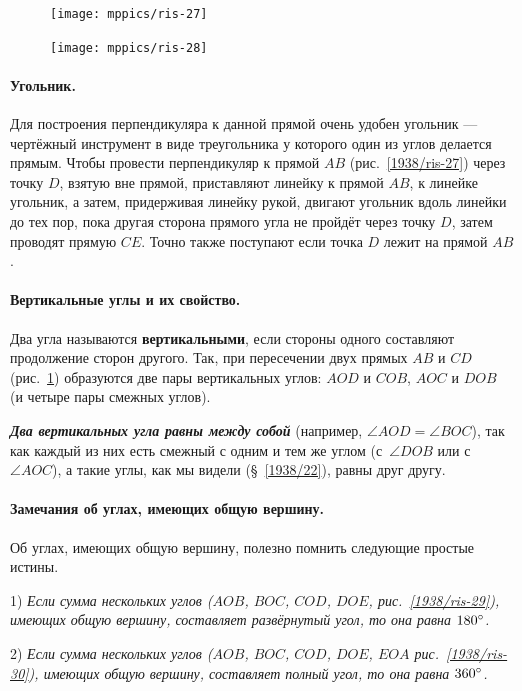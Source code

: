 \documentclass[oneside]{book}
\makeatletter
\newcommand{\rindex}[2][\imki@jobname]{%
  \index[#1]{\detokenize{#2}}%
}
\makeatother
\begin{document}
\begin{figure}
\centering
\texttt{[image: mppics/ris-27]}
\caption{}\label{1938/ris-27}
\bigskip
\texttt{[image: mppics/ris-28]}
\caption{}\label{1938/ris-28}
\end{figure}

\paragraph{Угольник.}\label{1938/25} 
Для построения перпендикуляра к данной прямой очень удобен угольник — чертёжный инструмент в виде треугольника у которого один из углов делается прямым.
Чтобы провести перпендикуляр к прямой $AB$ (рис.~\ref{1938/ris-27}) через точку $D$, взятую вне прямой, приставляют линейку к прямой $AB$, к линейке угольник, а затем, придерживая линейку рукой, двигают угольник вдоль линейки до тех пор, пока другая сторона прямого угла не пройдёт через точку $D$, затем проводят прямую $CE$.
Точно также поступают если точка $D$ лежит на прямой $AB$.

\paragraph{Вертикальные углы и их свойство.}\label{1938/26}
Два угла называются \rindex{вертикальные углы}\textbf{вертикальными}, если стороны одного составляют продолжение сторон другого.
Так, при пересечении двух прямых $AB$ и $CD$ (рис.~\ref{1938/ris-28}) образуются две пары вертикальных углов:
$AOD$ и $COB$, $AOC$ и $DOB$ (и четыре пары смежных углов).

\textbf{\emph{Два вертикальных угла равны между собой}} (например, $\angle AOD = \angle BOC$), так как каждый из них есть смежный с одним и тем же углом (с~$\angle DOB$ или с~$\angle AOC$), а такие углы, как мы видели (§~\ref{1938/22}), равны друг другу.

\paragraph{Замечания об углах, имеющих общую вершину.}\label{1938/27}
Об углах, имеющих общую вершину, полезно помнить следующие простые истины.

1) \emph{Если сумма нескольких углов ($AOB$, $BOC$, $COD$, $DOE$, рис.~\ref{1938/ris-29}), имеющих общую вершину, составляет развёрнутый угол, то она равна $180\degree$.}

2) \emph{Если сумма нескольких углов ($AOB$, $BOC$, $COD$, $DOE$, $EOA$ рис.~\ref{1938/ris-30}), имеющих общую вершину, составляет полный угол, то она равна  $360\degree$.}
\end{document}
